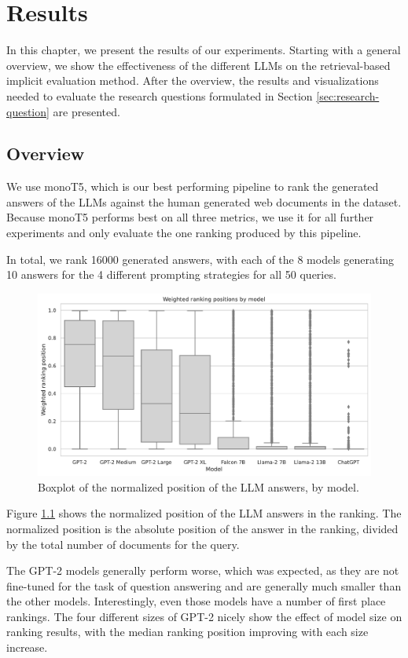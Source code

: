 \chapter{Results}\label{chapter:results}
In this chapter, we present the results of our experiments.
Starting with a general overview, we show the effectiveness of the different LLMs on the retrieval-based implicit evaluation method.
After the overview, the results and visualizations needed to evaluate the research questions formulated in Section \ref{sec:research-question} are presented.

\section{Overview}
We use monoT5, which is our best performing pipeline to rank the generated answers of the LLMs against the human generated web documents in the dataset.
Because monoT5 performs best on all three metrics, we use it for all further experiments and only evaluate the one ranking produced by this pipeline.

In total, we rank 16000 generated answers, with each of the 8 models generating 10 answers for the 4 different prompting strategies for all 50 queries.
\begin{figure}
\centering
\includegraphics[width=\textwidth]{images/weighted_position_boxplot.pdf}
\caption{Boxplot of the normalized position of the LLM answers, by model. }
\label{fig:weighted_position_boxplot}
\end{figure}
Figure \ref{fig:weighted_position_boxplot} shows the normalized position of the LLM answers in the ranking.
The normalized position is the absolute position of the answer in the ranking, divided by the total number of documents for the query.

The GPT-2 models generally perform worse, which was expected, as they are not fine-tuned for the task of question answering and are generally much smaller than the other models.
Interestingly, even those models have a number of first place rankings.
The four different sizes of GPT-2 nicely show the effect of model size on ranking results, with the median ranking position improving with each size increase.

